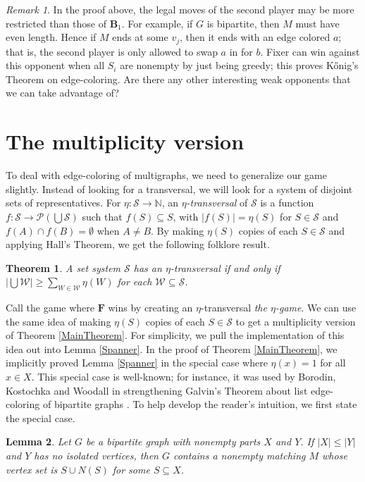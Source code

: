 \documentclass[12pt]{amsart}
\theoremstyle{plain}
\newtheorem{thm}{Theorem}[section]
\newtheorem{lem}[thm]{Lemma}
\theoremstyle{definition}
\theoremstyle{remark}
\newtheorem*{remark}{Remark}
\newcommand{\fancy}[1]{\mathcal{#1}}
\newcommand{\IN}{\mathbb{N}}
\newcommand{\card}[1]{\left|#1\right|}
\newcommand{\func}[3]{#1\colon #2 \rightarrow #3}
\newcommand{\parens}[1]{\left( #1 \right)}
\renewcommand{\S}{\fancy{S}}
\newcommand{\W}{\fancy{W}}
\renewcommand{\P}{\fancy{P}}
\newcommand{\F}{\mathbf{F}}
\newcommand{\B}{\mathbf{B}}
\begin{document}
\begin{remark}
In the proof above, the legal moves of the second player may be more restricted than those of $\B_1$.  For example, if $G$ is bipartite, then $M$ must have even length. Hence if $M$ ends at some $v_j$, then it ends with an edge colored $a$; that is, the second player is only allowed to swap $a$ in for $b$. Fixer can win against this opponent when all $S_i$ are nonempty by just being greedy; this proves  K\H{o}nig's Theorem on edge-coloring.  Are there any other interesting weak opponents that we can take advantage of?
\end{remark}

\section{The multiplicity version}\label{VizingMultiSection}
To deal with edge-coloring of multigraphs, we need to generalize our game slightly.
Instead of looking for a transversal, we will look for a system of
disjoint sets of representatives. For $\func{\eta}{\S}{\IN}$, an
\emph{$\eta$-transversal} of $\S$ is a function $\func{f}{\S}{\P\parens{\bigcup
\S}}$ such that $f(S) \subseteq S$, with $\card{f(S)} = \eta(S)$ for $S \in \S$ and
$f(A) \cap f(B) = \emptyset$ when $A \ne B$.  By making $\eta(S)$
copies of each $S \in \S$ and applying Hall's Theorem, we get the following folklore result.

\begin{thm}
A set system $\S$ has an $\eta$-transversal if and only if $\card{\bigcup \W} \geq \sum_{W \in \W}
\eta(W)$ for each $\W \subseteq \S$.
\end{thm}

Call the game where $\F$ wins by creating an $\eta$-transversal \emph{the
$\eta$-game}.  We can use the same idea of making $\eta(S)$
copies of each $S \in \S$  to get a multiplicity version of Theorem \ref{MainTheorem}.  
For simplicity, we pull the implementation of this idea out into Lemma \ref{Spanner}.  In the proof of Theorem \ref{MainTheorem}, we implicitly proved Lemma \ref{Spanner} in the special case where $\eta(x) = 1$ for all $x \in X$.  This special case is well-known; for instance, it was used by Borodin, Kostochka and Woodall \cite{BorodinKostochkaWoodall} in strengthening Galvin's Theorem about list edge-coloring of bipartite graphs \cite{galvin1995list}.  To help develop the reader's intuition, we first state the special case.

\begin{lem}\label{SpannerSpecial}
Let $G$ be a bipartite graph with nonempty parts $X$ and $Y$.  If $|X| \le |Y|$ and $Y$ has no isolated vertices, then $G$ contains a nonempty matching $M$ whose vertex set is $S \cup N(S)$ for some $S \subseteq X$.
\end{lem}
\end{document}
